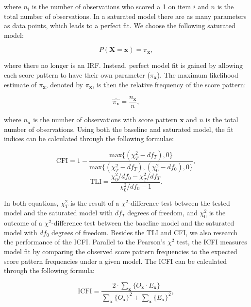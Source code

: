 \documentclass[Royal,sageapa,times,doublespace]{sagej}
\begin{document}
where $n_i$ is the number of observations who scored a 1 on item $i$ and $n$ is the total number of observations. In a saturated model there are as many parameters as data points, which leads to a perfect fit. We choose the following saturated model:

\begin{equation}
P(\boldsymbol{X} = \boldsymbol{x}) = \pi_{\boldsymbol{x}},
\end{equation}

where there no longer is an IRF. Instead, perfect model fit is gained by allowing each score pattern to have their own parameter ($\pi_{\boldsymbol{x}}$). The maximum likelihood estimate of $\pi_{\boldsymbol{x}}$, denoted by $\hat{\pi_{\boldsymbol{x}}}$, is then the relative frequency of the score pattern:

\begin{equation*}
\hat{\pi_{\boldsymbol{x}}} = \frac{n_{\boldsymbol{x}}}{n},
\end{equation*}

where $n_{\boldsymbol{x}}$ is the number of observations with score pattern $\boldsymbol{x}$ and $n$ is the total number of observations. Using both the baseline and saturated model, the fit indices can be calculated through the following formulae:

\begin{equation}
\text{CFI} = 1 - \frac{\text{max}\{(\chi^2_T - df_T), 0\}}{\text{max}\{(\chi^2_T - df_T), (\chi^2_0 - df_0), 0\}},
\end{equation}
\begin{equation}
\text{TLI} = \frac{\chi^2_0/df_0 - \chi^2_T/df_T}{\chi^2_0/df_0 - 1}.
\end{equation}

In both equations, $\chi^{2}_{T}$ is the result of a $\chi^2$-difference test between the tested model and the saturated model with $df_T$ degrees of freedom, and $\chi^{2}_{0}$ is the outcome of a $\chi^2$-difference test between the baseline model and the saturated model with $df_0$ degrees of freedom. Besides the TLI and CFI, we also research the performance of the ICFI. Parallel to the Pearson's $\chi^2$ test, the ICFI measures model fit by comparing the observed score pattern frequencies to the expected score pattern frequencies under a given model. The ICFI can be calculated through the following formula: 

\begin{equation}
\text{ICFI} = \frac{2 \cdot \sum_{\boldsymbol{x}} \{ O_{\boldsymbol{x}} \cdot E_{\boldsymbol{x}} \} }{  \sum_{\boldsymbol{x}} \{ O_{\boldsymbol{x}}\}^2 +  \sum_{\boldsymbol{x}} \{ E_{\boldsymbol{x}} \}^2 },
\end{equation}
\end{document}
